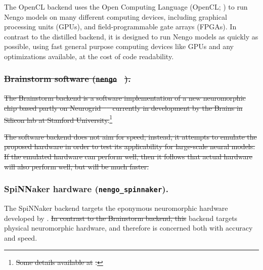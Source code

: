 \documentclass{frontiersSCNS}
\providecommand{\DIFadd}[1]{{\protect\color{blue}\uwave{#1}}} %
\providecommand{\DIFdel}[1]{{\protect\color{red}\sout{#1}}}                      %
\providecommand{\DIFaddbegin}{} %
\providecommand{\DIFaddend}{} %
\providecommand{\DIFdelbegin}{} %
\providecommand{\DIFdelend}{} %
\begin{document}
The OpenCL backend uses the Open Computing Language
(OpenCL; \citealp{stone2010})
to run Nengo models on many different computing devices,
including graphical processing units (GPUs),
and field-programmable gate arrays (FPGAs).
In contrast to the distilled backend,
it is designed to run Nengo models
as quickly as possible,
using fast general purpose computing devices
like GPUs and any optimizations available,
at the cost of code readability.

\DIFdelbegin \subsubsection{\DIFdel{Brainstorm software (}\texttt{\DIFdel{nengo}%
}%
\DIFdel{).}}
\addtocounter{subsubsection}{-1}%

\DIFdel{The Brainstorm backend is a software implementation
of a new neuromorphic chip
based partly on Neurogrid \mbox{%
\citep{benjamin2014}
}%
currently in development
by the Brains in Silicon lab
at Stanford University.}\footnote{\DIFdel{
  Some details available at }%
\DIFdel{.}}
\addtocounter{footnote}{-1}%
\DIFdel{The software backend does not aim for speed;
instead, it attempts to emulate the proposed hardware
in order to test its applicability
for large-scale neural models.
If the emulated hardware can perform well,
then it follows that actual hardware
will also perform well,
but will be much faster.
}%

\DIFdelend \subsubsection{SpiNNaker hardware (\texttt{nengo\_spinnaker}).}

The SpiNNaker backend \citep{mundy2015}
targets the eponymous neuromorphic hardware
developed by \citet{furber2014}.
\DIFdelbegin \DIFdel{In contrast to the Brainstorm backend,
this }\DIFdelend \DIFaddbegin \DIFadd{This }\DIFaddend backend targets physical neuromorphic hardware,
and therefore is concerned
both with accuracy and speed.
\end{document}
